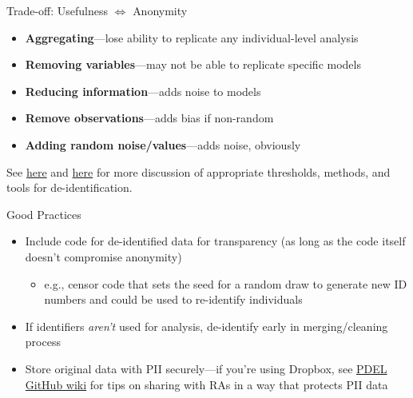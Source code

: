 \documentclass[12pt, compress]{beamer} %
\let\noteitem\item %
\renewcommand{\item}{ 
	\noteitem\vspace{\fill}
	}
\begin{document}
	\begin{frame}{Trade-off: \textcolor{burntorange}{Usefulness} $\Longleftrightarrow$ \textcolor{burntorange}{Anonymity}}
		
		\begin{itemize}
			\item \textbf{Aggregating}---lose ability to replicate any individual-level analysis
			\item \textbf{Removing variables}---may not be able to replicate specific models
			\item \textbf{Reducing information}---adds noise to models
			\item \textbf{Remove observations}---adds bias if non-random
			\item \textbf{Adding random noise/values}---adds noise, obviously
		\end{itemize}	
	
	
	\bigskip
			See \href{http://www.ehealthinformation.ca/wp-content/uploads/2014/08/2010-Risk-based-de-identification-of-health-data.pdf}{here} and \href{http://www.ehealthinformation.ca/wp-content/uploads/2014/08/2009-Tools-for-De-Identification-of-Personal-Health.pdf}{here} for more discussion of appropriate thresholds, methods, and tools for de-identification.

	\end{frame}
	
	\begin{frame}{Good Practices}
			\begin{itemize}
				\item Include code for de-identified data for transparency (as long as the code itself doesn't compromise anonymity) 
					\begin{itemize}
						\item e.g., censor code that sets the seed for a random draw to generate new ID numbers and could be used to re-identify individuals
					\end{itemize}
				\item If identifiers \textit{aren't} used for analysis, de-identify early in merging/cleaning process
				\item Store original data with PII securely---if you're using Dropbox, see \href{https://github.com/PolicyDesignEvaluationLab/Transparency-Initiative/wiki/Tips:-Protocol-for-Sharing-Data-via-Dropbox}{PDEL GitHub wiki} for tips on sharing with RAs in a way that protects PII data
			\end{itemize} 	
	\end{frame}
		
\end{document}
